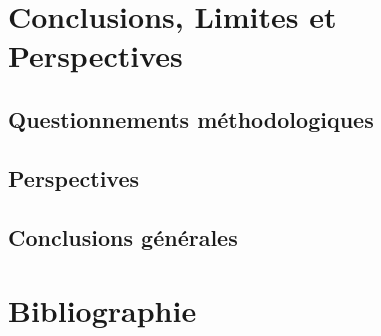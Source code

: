 \documentclass[a4paper, twoside, 12pt]{book}
\begin{document}
\chapter{Conclusions, Limites et Perspectives}

\section{Questionnements méthodologiques}

\section{Perspectives}

\section{Conclusions générales}

\chapter{Bibliographie}
\end{document}
